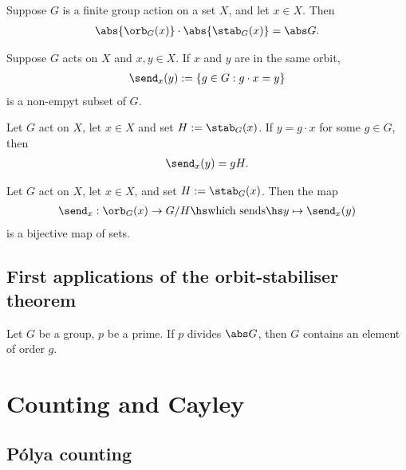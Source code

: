 \documentclass{article}
\begin{document}
\begin{theorem}
    Suppose $G$ is a finite group action on a set $X$, and let $x\in X$.
    Then 
    \begin{align*}
        \abs{\orb_G(x)}\cdot \abs{\stab_G(x)}=\abs G. 
    \end{align*}
\end{theorem}

\begin{definition}
    Suppose $G$ acts on $X$ and $x,y\in X$. If $x$ and $y$
    are in the same orbit,
    \begin{align*}
        \send_x(y):=\{g\in G : g\cdot x = y\}
    \end{align*}
    is a non-empyt subset of $G$.
\end{definition}

\begin{proposition}
    Let $G$ act on $X$, let $x\in X$ and set $H:=\stab_G(x)$.
    If $y=g\cdot x$ for some $g\in G$, then
    \begin{align*}
        \send_x(y) = gH.
    \end{align*}
\end{proposition}

\begin{theorem}
    Let $G$ act on $X$, let $x\in X$, and set $H:=\stab_G(x)$.
    Then the map
    \begin{align*}
        \send_x:\orb_G(x)\to G/H \hs\text{which sends}\hs y\mapsto \send_x(y)
    \end{align*}
    is a bijective map of sets.
\end{theorem}

\subsection{First applications of the orbit-stabiliser theorem}

\begin{theorem}
    Let $G$ be a group, $p$ be a prime. If $p$ divides $\abs G$,
    then $G$ contains an element of order $g$. 
\end{theorem}


\section{Counting and Cayley}

\subsection{P\'olya counting}
\end{document}
